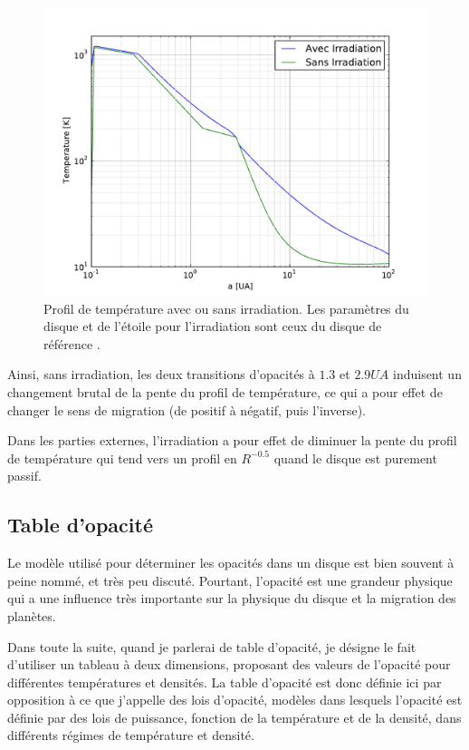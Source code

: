 \begin{figure}[htb]
\centering
\includegraphics[width=0.6\linewidth]{figure/migration_map/temperature_with_irradiation.pdf}
\caption{Profil de température avec ou sans irradiation. Les paramètres du disque et de l'étoile pour l'irradiation sont ceux du disque de référence \protect{}.}\label{fig:temp_profile_irradiation}
\end{figure}

Ainsi, sans irradiation, les deux transitions d'opacités à $1.3$ et $2.9\unit{UA}$ induisent un changement brutal de la pente
du profil de température, ce qui a pour effet de changer le sens de migration (de positif à négatif, puis l'inverse).

Dans les parties externes, l'irradiation a pour effet de diminuer la pente du profil de température qui tend vers un profil en
$R^{-0.5}$ quand le disque est purement passif.


\subsection{Table d'opacité}\label{sec:influence_opacity_table}
Le modèle utilisé pour déterminer les opacités dans un disque est bien souvent à peine nommé, et très peu discuté. Pourtant,
l'opacité est une grandeur physique qui a une influence très importante sur la physique du disque et la migration des planètes. 

Dans toute la suite, quand je parlerai de table d'opacité, je désigne le fait d'utiliser un tableau à deux dimensions,
proposant des valeurs de l'opacité pour différentes températures et densités. La table d'opacité est donc définie ici par
opposition à ce que j'appelle des lois d'opacité, modèles dans lesquels l'opacité est définie par des lois de puissance,
fonction de la température et de la densité, dans différents régimes de température et densité.

